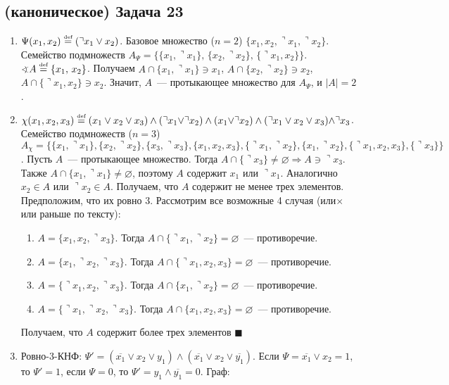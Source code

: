 \documentclass[a4paper]{article}
\def\eqdef{\overset{\mbox{\tiny def}}{=}}
\begin{document}
\subsection*{(каноническое) Задача 23}
\begin{enumerate}
\item $\Psi(x_1,x_2)\eqdef (\urcorner x_1\vee x_2)$. Базовое множество ($n=2$) $\{x_1,x_2,\urcorner x_1,\urcorner x_2\}$.\newline
Семейство подмножеств $A_\Psi=\big\{\{x_1,\urcorner x_1\},\,\{x_2,\urcorner x_2\},\,\{\urcorner x_1,x_2\}\big\}$.\newline
$\varangle A\eqdef\{x_1,\,x_2\}$. Получаем $A\cap\{x_1,\urcorner x_1\}\ni x_1$, $A\cap \{x_2,\urcorner x_2\}\ni x_2$, $A\cap \{\urcorner x_1, x_2\}\ni x_2$.\newline
Значит, $A$~--- протыкающее множество для $A_\Psi$, и $|A|=2$.
\item $\chi(x_1,x_2,x_3)\eqdef (x_1\vee x_2\vee x_3)\wedge(\urcorner x_1\vee \urcorner x_2)\wedge(x_1\vee \urcorner x_2)\wedge (\urcorner x_1\vee x_2\vee x_3)\wedge\urcorner x_3$. Семейство подмножеств ($n=3$) $A_\chi=\big\{\{x_1,\urcorner x_1\},\{x_2,\urcorner x_2\},\{x_3,\urcorner x_3\},\{x_1,x_2,x_3\},\{\urcorner x_1,\urcorner x_2\},\{x_1,\urcorner x_2\},\{\urcorner x_1,x_2,x_3\},\{\urcorner x_3\}\big\}$. Пусть $A$~--- протыкающее множество. Тогда $A\cap \{\urcorner x_3\}\neq \varnothing\Rightarrow A\ni \urcorner x_3$. Также $A\cap\{x_1,\urcorner x_1\}\neq\varnothing$, поэтому $A$ содержит $x_1$ или $\urcorner x_1$. Аналогично $x_2\in A$ или $\urcorner x_2\in A$. Получаем, что $A$ содержит не менее трех элементов. Предположим, что их ровно 3. Рассмотрим все возможные 4 случая (или$\times$или раньше по тексту):\begin{enumerate}
\item $A=\{x_1,x_2,\urcorner x_3\}$. Тогда $A\cap \{\urcorner x_1,\urcorner x_2\}=\varnothing$~--- противоречие.
\item $A=\{x_1,\urcorner x_2,\urcorner x_3\}$. Тогда $A\cap \{\urcorner x_1,x_2,x_3\}=\varnothing$~--- противоречие.
\item $A=\{\urcorner x_1,x_2,\urcorner x_3\}$. Тогда $A\cap \{x_1,\urcorner x_2\}=\varnothing$~--- противоречие.
\item $A=\{\urcorner x_1,\urcorner x_2,\urcorner x_3\}$. Тогда $A\cap\{x_1,x_2,x_3\}=\varnothing$~--- противоречие.
\end{enumerate}
Получаем, что $A$ содержит более трех элементов $\blacksquare$
\item Ровно-3-КНФ: $\Psi'=(\overline{x_1}\vee x_2\vee y_1)\wedge(\overline{x_1}\vee x_2\vee \overline{y_1})$. Если $\Psi=\overline{x_1}\vee x_2=1$, то $\Psi'=1$, если $\Psi=0$, то $\Psi'=y_1\wedge\overline{y_1}=0$. Граф:

\end{enumerate}
\end{document}
